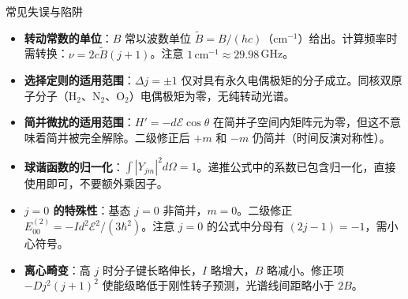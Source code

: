 \begin{errorbox}{常见失误与陷阱}
\begin{itemize}
    \item \textbf{转动常数的单位}：$B$ 常以波数单位 $\tilde B=B/(hc)$（cm$^{-1}$）给出。计算频率时需转换：$\nu=2c\tilde B(j+1)$。注意 $1\,\text{cm}^{-1}\approx29.98\,$GHz。
    \item \textbf{选择定则的适用范围}：$\Delta j=\pm1$ 仅对具有永久电偶极矩的分子成立。同核双原子分子（$\text{H}_2$、$\text{N}_2$、$\text{O}_2$）电偶极矩为零，无纯转动光谱。
    \item \textbf{简并微扰的适用范围}：$H'=-d\mathcal{E}\cos\theta$ 在简并子空间内矩阵元为零，但这不意味着简并被完全解除。二级修正后 $+m$ 和 $-m$ 仍简并（时间反演对称性）。
    \item \textbf{球谐函数的归一化}：$\int|Y_{jm}|^2d\Omega=1$。递推公式中的系数已包含归一化，直接使用即可，不要额外乘因子。
    \item \textbf{$j=0$ 的特殊性}：基态 $j=0$ 非简并，$m=0$。二级修正 $E_{00}^{(2)}=-Id^2\mathcal{E}^2/(3\hbar^2)$。注意 $j=0$ 的公式中分母有 $(2j-1)=-1$，需小心符号。
    \item \textbf{离心畸变}：高 $j$ 时分子键长略伸长，$I$ 略增大，$B$ 略减小。修正项 $-Dj^2(j+1)^2$ 使能级略低于刚性转子预测，光谱线间距略小于 $2B$。
\end{itemize}
\end{errorbox}

